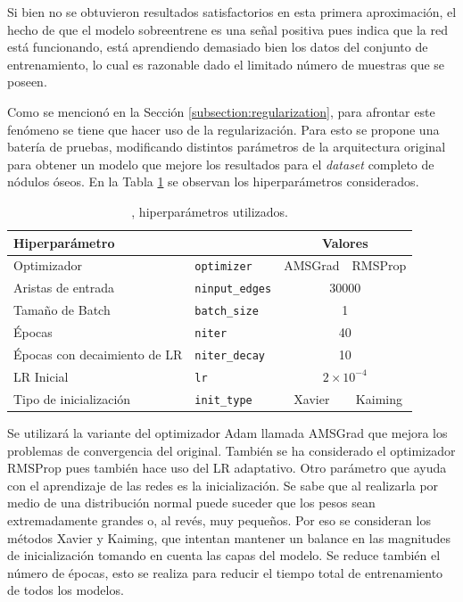 Si bien no se obtuvieron resultados satisfactorios en esta primera aproximación, el hecho de que el modelo sobreentrene es una señal positiva pues indica que la red está funcionando, está aprendiendo demasiado bien los datos del conjunto de entrenamiento, lo cual es razonable dado el limitado número de muestras que se poseen.

Como se mencionó en la Sección \ref{subsection:regularization}, para afrontar este fenómeno se tiene que hacer uso de la regularización. Para esto se propone una batería de pruebas, modificando distintos parámetros de la arquitectura original para obtener un modelo que mejore los resultados para el \textit{dataset} completo de nódulos óseos. En la Tabla \ref{table:nodule-98-30K-GS_hyperParams} se observan los hiperparámetros considerados.

\begin{table}[h]
\centering
\begin{tabular}{|ll|cc|}
\hline
\multicolumn{2}{|l|}{\cellcolor[HTML]{FFC702}Hiperparámetro} & \multicolumn{2}{c|}{\cellcolor[HTML]{FFC702}Valores} \\ \hline
Optimizador & \lstinline!optimizer! & \multicolumn{1}{c|}{AMSGrad} & RMSProp \\ \hline
Aristas de entrada & \lstinline!ninput_edges! & \multicolumn{2}{c|}{30000} \\ \hline
Tamaño de Batch & \lstinline!batch_size! & \multicolumn{2}{c|}{1} \\ \hline
Épocas & \lstinline!niter! & \multicolumn{2}{c|}{40} \\ \hline
Épocas con decaimiento de LR & \lstinline!niter_decay! & \multicolumn{2}{c|}{10} \\ \hline
LR Inicial & \lstinline!lr! & \multicolumn{2}{c|}{$2\times10^{-4}$} \\ \hline
Tipo de inicialización & \lstinline!init_type! & \multicolumn{1}{c|}{Xavier} & Kaiming \\ \hline
\end{tabular}
\caption[Nodule-98-30K-GS-*: Hiperparámetros]{, hiperparámetros utilizados.}
\label{table:nodule-98-30K-GS_hyperParams}
\end{table}

Se utilizará la variante del optimizador Adam llamada AMSGrad que mejora los problemas de convergencia del original. También se ha considerado el optimizador RMSProp pues también hace uso del LR adaptativo. Otro parámetro que ayuda con el aprendizaje de las redes es la inicialización. Se sabe que al realizarla por medio de una distribución normal puede suceder que los pesos sean extremadamente grandes o, al revés, muy pequeños. Por eso se consideran los métodos Xavier y Kaiming, que intentan mantener un balance en las magnitudes de inicialización tomando en cuenta las capas del modelo. Se reduce también el número de épocas, esto se realiza para reducir el tiempo total de entrenamiento de todos los modelos.


